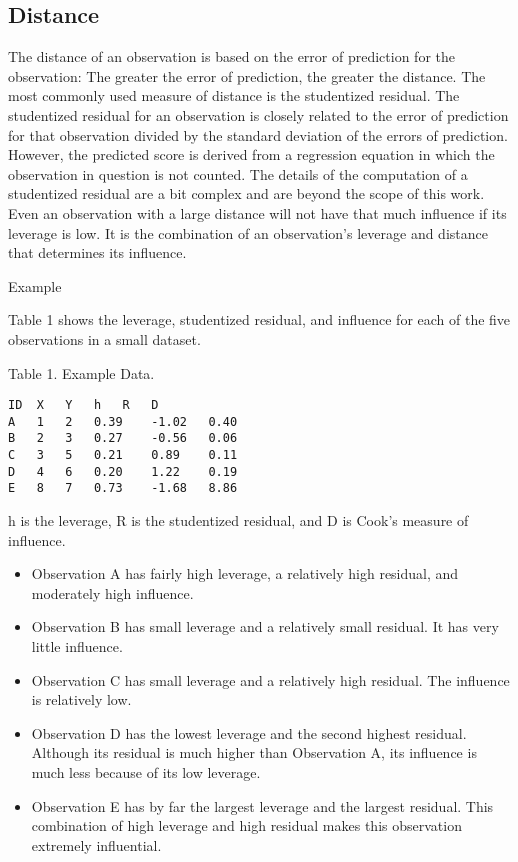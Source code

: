 \subsection*{Distance}
The distance of an observation is based on the error of prediction for the observation: The greater the error of prediction, the greater the distance. The most commonly used measure of distance is the studentized residual. The studentized residual for an observation is closely related to the error of prediction for that observation divided by the standard deviation of the errors of prediction. However, the predicted score is derived from a regression equation in which the observation in question is not counted. The details of the computation of a studentized residual are a bit complex and are beyond the scope of this work.
Even an observation with a large distance will not have that much influence if its leverage is low. It is the combination of an observation's leverage and distance that determines its influence.

Example

Table 1 shows the leverage, studentized residual, and influence for each of the five observations in a small dataset.
\begin{framed}
Table 1. Example Data.
\begin{verbatim}
ID	X	Y	h	R	D
A	1	2	0.39	-1.02	0.40
B	2	3	0.27	-0.56	0.06
C	3	5	0.21	0.89	0.11
D	4	6	0.20	1.22	0.19
E	8	7	0.73	-1.68	8.86
\end{verbatim}
\end{framed}
h is the leverage, R is the studentized residual, and D is Cook's measure of influence.

\begin{itemize}
\item Observation A has fairly high leverage, a relatively high residual, and moderately high influence.

\item Observation B has small leverage and a relatively small residual. It has very little influence.

\item Observation C has small leverage and a relatively high residual. The influence is relatively low.

\item Observation D has the lowest leverage and the second highest residual. Although its residual is much higher than Observation A, its influence is much less because of its low leverage.

\item Observation E has by far the largest leverage and the largest residual. This combination of high leverage and high residual makes this observation extremely influential.
\end{itemize}

